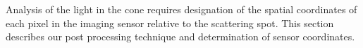 Analysis of the light in the cone requires designation of the spatial
coordinates of each pixel in the imaging sensor relative to the scattering
spot.  This section describes our post processing technique and
determination of sensor coordinates.
